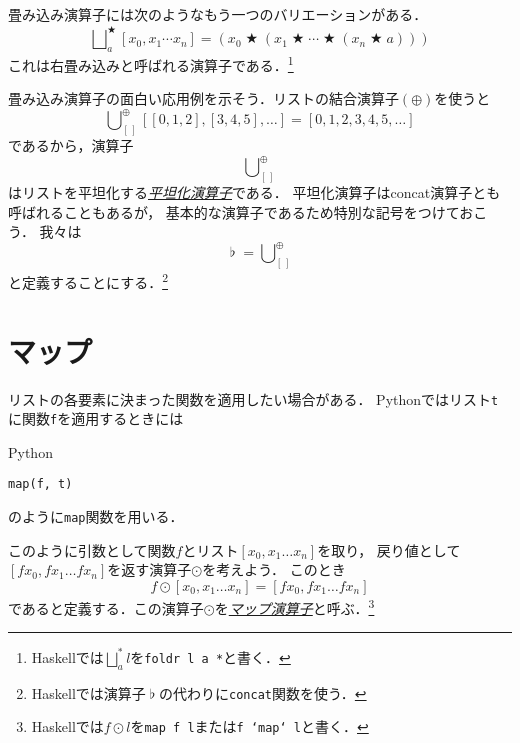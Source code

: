 \documentclass[a5paper,draft]{jsbook}
\newcommand{\programminglanguage}[1]{\textsf{#1}}
\newcommand{\haskell}{\programminglanguage{Haskell}}
\newcommand{\python}{\programminglanguage{Python}}
\newcommand{\keyword}[1]{{\underline{\emph{#1}}}}
\newcommand{\code}[1]{\texttt{#1}}
\newenvironment{pythoncode}{\begin{itembox}[r]{\python}}{\end{itembox}}
\newcommand{\mathEmptyList}{{[\,]}}
\DeclareMathOperator{\mathConcat}{\flat}
\DeclareMathOperator*{\mathFold}{\bigcup}
\DeclareMathOperator*{\mathFoldRight}{\bigsqcup}
\newcommand{\mathAnyBinaryOperator}{\mathbin{\bigstar}}
\newcommand{\mathAppend}{\oplus}
\newcommand{\mathMap}{\mathbin{\odot}}
\begin{document}
畳み込み演算子には次のようなもう一つのバリエーションがある．
\begin{equation}
\mathFoldRight^{\mathAnyBinaryOperator}_{a}[x_0,x_1\dotsb x_n]=\left(x_0\mathAnyBinaryOperator\left(x_1\mathAnyBinaryOperator\dotsb\mathAnyBinaryOperator\left(x_n\mathAnyBinaryOperator a\right)\right)\right)
\end{equation}
これは右畳み込みと呼ばれる演算子である．\footnote{\haskell では$\mathFoldRight^{*}_{a}l$を\code{foldr l a *}と書く．}

畳み込み演算子の面白い応用例を示そう．リストの結合演算子$(\mathAppend)$を使うと
\begin{equation}
\mathFold_\mathEmptyList^\mathAppend[[0,1,2],[3,4,5],\dots]=[0,1,2,3,4,5,\dots]
\end{equation}
であるから，演算子
\begin{equation}
\mathFold_\mathEmptyList^\mathAppend
\end{equation}
はリストを平坦化する\keyword{平坦化演算子}である．
平坦化演算子はconcat演算子とも呼ばれることもあるが，
基本的な演算子であるため特別な記号をつけておこう．
我々は
\begin{equation}
\mathConcat=\mathFold_\mathEmptyList^\mathAppend
\end{equation}
と定義することにする．\footnote{\haskell では演算子$\mathConcat$の代わりに\code{concat}関数を使う．}

\section{マップ}

リストの各要素に決まった関数を適用したい場合がある．
\python ではリスト\code{t}に関数\code{f}を適用するときには
\begin{pythoncode}
\begin{verbatim}
map(f, t)
\end{verbatim}
\end{pythoncode}
のように\code{map}関数を用いる．

このように引数として関数$f$とリスト$[x_0,x_1\dots x_n]$を取り，
戻り値として$[fx_0,fx_1\dots fx_n]$を返す演算子$\mathMap$を考えよう．
このとき
\begin{equation}
f\mathMap[x_0,x_1\dots x_n]=[fx_0,fx_1\dots fx_n]
\end{equation}
であると定義する．この演算子$\mathMap$を\keyword{マップ演算子}と呼ぶ．\footnote{\haskell では$f\mathMap l$を\code{map f l}または\code{f `map` l}と書く．}
\end{document}

